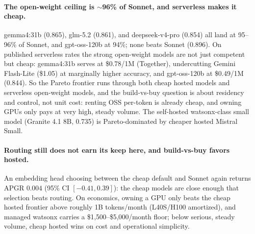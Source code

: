 \documentclass[11pt]{article}
\begin{document}
\paragraph{The open-weight ceiling is $\sim$96\% of Sonnet, and serverless makes it cheap.}
gemma4:31b (0.865), glm-5.2 (0.861), and deepseek-v4-pro (0.854) all land at 95--96\% of
Sonnet, and gpt-oss-120b at 94\%; none beats Sonnet (0.896). On published serverless rates the
strong open-weight models are not just competent but cheap: gemma4:31b serves at \$0.78/1M
(Together), undercutting Gemini Flash-Lite (\$1.05) at marginally higher accuracy, and
gpt-oss-120b at \$0.49/1M (0.844). So the Pareto frontier runs through both cheap hosted models
and serverless open-weight models, and the build-vs-buy question is about residency and control,
not unit cost: renting OSS per-token is already cheap, and owning GPUs only pays at very high,
steady volume. The self-hosted watsonx-class small model (Granite 4.1 8B, 0.735) is
Pareto-dominated by cheaper hosted Mistral Small.

\paragraph{Routing still does not earn its keep here, and build-vs-buy favors hosted.} An
embedding head choosing between the cheap default and Sonnet again returns APGR $0.004$
(95\% CI $[-0.41, 0.39]$): the cheap models are close enough that selection beats routing.
On economics, owning a GPU only beats the cheap hosted frontier above roughly 1B
tokens/month (L40S/H100 amortized), and managed watsonx carries a \$1{,}500--\$5{,}000/month
floor; below serious, steady volume, cheap hosted wins on cost and operational simplicity.
\end{document}
